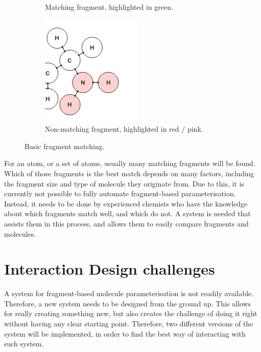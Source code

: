 \begin{figure}[h!]
\begin{subfigure}[t]{0.29\textwidth}
\caption{Matching fragment, highlighted in green.}
\end{subfigure}%
\qquad
\begin{subfigure}[t]{0.29\textwidth}
\centering
\includegraphics[width=\textwidth]{img/match_3.png}
\caption{Non-matching fragment, highlighted in red / pink.}
\end{subfigure}
\caption{Basic fragment matching.}
\end{figure}

For an atom, or a set of atoms, usually many matching fragments will be found. Which of those fragments is the best match depends on many factors, including the fragment size and type of molecule they originate from. Due to this, it is currently not possible to fully automate fragment-based parameterisation. Instead, it needs to be done by experienced chemists who have the knowledge about which fragments match well, and which do not. A system is needed that assists them in this process, and allows them to easily compare fragments and molecules.


\section{Interaction Design challenges}
A system for fragment-based molecule parameterisation is not readily available. Therefore, a new system needs to be designed from the ground up. This allows for really creating something new, but also creates the challenge of doing it right without having any clear starting point. Therefore, two different versions of the system will be implemented, in order to find the best way of interacting with such system.

